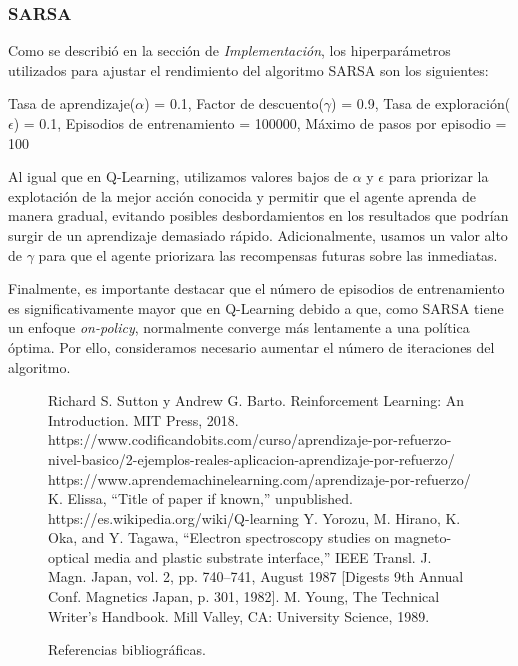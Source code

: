 \documentclass[conference,a4paper]{IEEEtran}
\begin{document}
\subsubsection{\textbf{SARSA}}

Como se describió en la sección de \textit{Implementación}, los hiperparámetros utilizados para ajustar el rendimiento del algoritmo SARSA son los siguientes:\newline

Tasa de aprendizaje($\alpha$) = 0.1, Factor de descuento($\gamma$) = 0.9, Tasa de exploración($\epsilon$) = 0.1,  Episodios de entrenamiento = 100000, Máximo de pasos por episodio = 100\newline

Al igual que en Q-Learning, utilizamos valores bajos de $\alpha$ y $\epsilon$ para priorizar la explotación de la mejor acción conocida y permitir que el agente aprenda de manera gradual, evitando posibles 
desbordamientos en los resultados que podrían surgir de un aprendizaje demasiado rápido. Adicionalmente, usamos un valor alto de $\gamma$ para que el agente priorizara las recompensas futuras sobre las inmediatas.\newline

Finalmente, es importante destacar que el número de episodios de entrenamiento es significativamente mayor que en Q-Learning debido a que, como SARSA tiene un enfoque \textit{on-policy},
normalmente converge más lentamente a una política óptima. Por ello, consideramos necesario aumentar el número de iteraciones del algoritmo.




\begin{figure}[h!]
  \begin{thebibliography}{99}
   Richard S. Sutton y Andrew G. Barto. Reinforcement Learning: An Introduction.
  MIT Press, 2018.
   https://www.codificandobits.com/curso/aprendizaje-por-refuerzo-nivel-basico/2-ejemplos-reales-aplicacion-aprendizaje-por-refuerzo/
   https://www.aprendemachinelearning.com/aprendizaje-por-refuerzo/
   K. Elissa, ``Title of paper if known,'' unpublished.
   https://es.wikipedia.org/wiki/Q-learning
   Y. Yorozu, M. Hirano, K. Oka, and Y. Tagawa, ``Electron spectroscopy studies on magneto-optical media and plastic substrate interface,'' IEEE Transl. J. Magn. Japan, vol. 2, pp. 740--741, August 1987 [Digests 9th Annual Conf. Magnetics Japan, p. 301, 1982].
   M. Young, The Technical Writer's Handbook. Mill Valley, CA: University Science, 1989.
  \end{thebibliography}
  \caption{Referencias bibliográficas.}
  \label{fig:bibliography}
  \end{figure}
  
\end{document}
